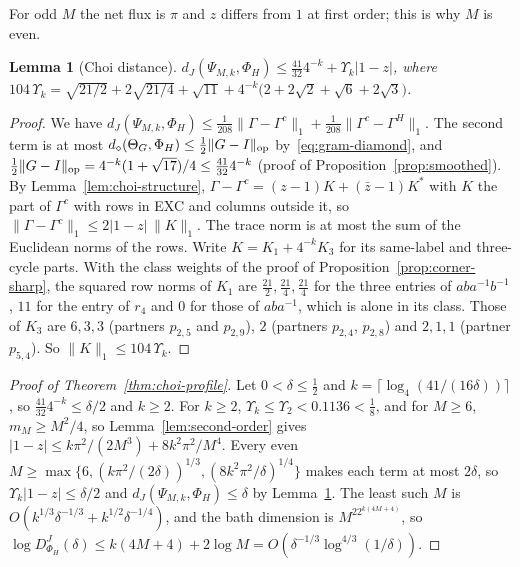 \documentclass[11pt,a4paper]{article}
\theoremstyle{plain}
\newtheorem{lemma}[theorem]{Lemma}
\theoremstyle{definition}
\theoremstyle{remark}
\newcommand{\DChoi}{D^{J}}
\newcommand{\dJ}{d_J}
\newcommand{\ddia}{d_\diamond}
\begin{document}
For odd $M$ the net flux is $\pi$ and $z$ differs from $1$ at first order; this is why $M$ is even.

\begin{lemma}[Choi distance]\label{lem:choi-distance}
$\dJ(\Psi_{M,k},\Phi_H)\le\frac{41}{32}4^{-k}+\Upsilon_k|1-z|$, where $104\,\Upsilon_k=\sqrt{21/2}+2\sqrt{21/4}+\sqrt{11}+4^{-k}\big(2+2\sqrt2+\sqrt6+2\sqrt3\big)$.
\end{lemma}

\begin{proof}
We have $\dJ(\Psi_{M,k},\Phi_H)\le\frac1{208}\|\Gamma-\Gamma^c\|_1+\frac1{208}\|\Gamma^c-\Gamma^H\|_1$. The second term is at most
$\ddia(\Theta_G,\Phi_H)\le\frac12\|G-I\|_{\rm op}$ by~\eqref{eq:gram-diamond}, and $\frac12\|G-I\|_{\rm op}=4^{-k}(1+\sqrt{17})/4\le\frac{41}{32}4^{-k}$ (proof of Proposition~\ref{prop:smoothed}). By
Lemma~\ref{lem:choi-structure}, $\Gamma-\Gamma^c=(z-1)K+(\bar z-1)K^*$ with $K$ the part of $\Gamma^c$ with rows in EXC and columns outside it, so
$\|\Gamma-\Gamma^c\|_1\le2|1-z|\,\|K\|_1$. The trace norm is at most the sum of the Euclidean norms of the rows. Write $K=K_1+4^{-k}K_3$ for its same-label
and three-cycle parts. With the class weights of the proof of Proposition~\ref{prop:corner-sharp}, the squared row norms of $K_1$ are $\frac{21}2,\frac{21}4,\frac{21}4$
for the three entries of $aba^{-1}b^{-1}$, $11$ for the entry of $r_4$ and $0$ for those of $aba^{-1}$, which is alone in its class. Those of $K_3$ are
$6,3,3$ (partners $p_{2,5}$ and $p_{2,9}$), $2$ (partners $p_{2,4}$, $p_{2,8}$) and $2,1,1$ (partner $p_{5,4}$). So $\|K\|_1\le104\,\Upsilon_k$.
\end{proof}

\begin{proof}[Proof of Theorem~\ref{thm:choi-profile}]
Let $0<\delta\le\frac12$ and $k=\lceil\log_4(41/(16\delta))\rceil$, so $\frac{41}{32}4^{-k}\le\delta/2$ and $k\ge2$. For $k\ge2$, $\Upsilon_k\le\Upsilon_2<0.1136<\frac18$, and for
$M\ge6$, $m_M\ge M^2/4$, so Lemma~\ref{lem:second-order} gives $|1-z|\le k\pi^2/(2M^3)+8k^2\pi^2/M^4$. Every even
$M\ge\max\{6,(k\pi^2/(2\delta))^{1/3},(8k^2\pi^2/\delta)^{1/4}\}$ makes each term at most $2\delta$, so $\Upsilon_k|1-z|\le\delta/2$ and $\dJ(\Psi_{M,k},\Phi_H)\le\delta$ by
Lemma~\ref{lem:choi-distance}. The least such $M$ is $O(k^{1/3}\delta^{-1/3}+k^{1/2}\delta^{-1/4})$, and the bath dimension is $M^22^{k(4M+4)}$, so
$\log\DChoi_{\Phi_H}(\delta)\le k(4M+4)+2\log M=O(\delta^{-1/3}\log^{4/3}(1/\delta))$.
\end{proof}
\end{document}
